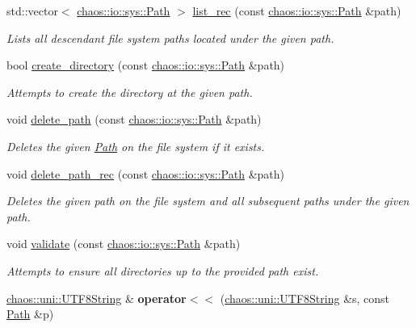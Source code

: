 \begin{DoxyCompactItemize}
std\-::vector$<$ \hyperlink{classchaos_1_1io_1_1sys_1_1_path}{chaos\-::io\-::sys\-::\-Path} $>$ \hyperlink{namespacechaos_1_1io_1_1sys_a956856df76f476b3300ab1ebe733e2a7}{list\-\_\-rec} (const \hyperlink{classchaos_1_1io_1_1sys_1_1_path}{chaos\-::io\-::sys\-::\-Path} \&path)
\begin{DoxyCompactList}\small\item\em Lists all descendant file system paths located under the given path. \end{DoxyCompactList}\item 
bool \hyperlink{namespacechaos_1_1io_1_1sys_a6bcdadf916b110395f4a2627c049da11}{create\-\_\-directory} (const \hyperlink{classchaos_1_1io_1_1sys_1_1_path}{chaos\-::io\-::sys\-::\-Path} \&path)
\begin{DoxyCompactList}\small\item\em Attempts to create the directory at the given path. \end{DoxyCompactList}\item 
void \hyperlink{namespacechaos_1_1io_1_1sys_afe2226ee576ac8aba15ca3baa0322ff6}{delete\-\_\-path} (const \hyperlink{classchaos_1_1io_1_1sys_1_1_path}{chaos\-::io\-::sys\-::\-Path} \&path)
\begin{DoxyCompactList}\small\item\em Deletes the given \hyperlink{classchaos_1_1io_1_1sys_1_1_path}{Path} on the file system if it exists. \end{DoxyCompactList}\item 
void \hyperlink{namespacechaos_1_1io_1_1sys_a00c090bbfe1da7e7cb00dc99c7459a21}{delete\-\_\-path\-\_\-rec} (const \hyperlink{classchaos_1_1io_1_1sys_1_1_path}{chaos\-::io\-::sys\-::\-Path} \&path)
\begin{DoxyCompactList}\small\item\em Deletes the given path on the file system and all subsequent paths under the given path. \end{DoxyCompactList}\item 
void \hyperlink{namespacechaos_1_1io_1_1sys_a15e20b105c40cf4d73b13afe87ce1781}{validate} (const \hyperlink{classchaos_1_1io_1_1sys_1_1_path}{chaos\-::io\-::sys\-::\-Path} \&path)
\begin{DoxyCompactList}\small\item\em Attempts to ensure all directories up to the provided path exist. \end{DoxyCompactList}\item 
\hypertarget{namespacechaos_1_1io_1_1sys_a669178b3843d1716570b4b5ca8fd417d}{\hyperlink{classchaos_1_1uni_1_1_u_t_f8_string}{chaos\-::uni\-::\-U\-T\-F8\-String} \& {\bfseries operator$<$$<$} (\hyperlink{classchaos_1_1uni_1_1_u_t_f8_string}{chaos\-::uni\-::\-U\-T\-F8\-String} \&s, const \hyperlink{classchaos_1_1io_1_1sys_1_1_path}{Path} \&p)}\label{namespacechaos_1_1io_1_1sys_a669178b3843d1716570b4b5ca8fd417d}


\end{DoxyCompactItemize}
